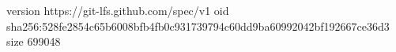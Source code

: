 version https://git-lfs.github.com/spec/v1
oid sha256:528fe2854c65b6008bfb4fb0c931739794c60dd9ba60992042bf192667ce36d3
size 699048
